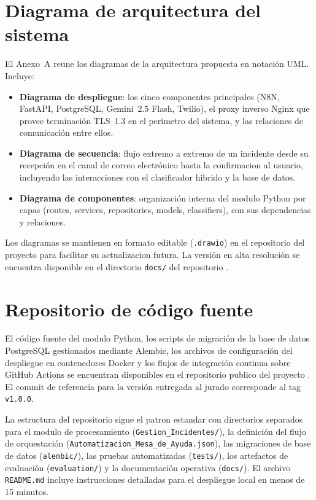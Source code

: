 
\section{Diagrama de arquitectura del sistema}

El Anexo~A reune los diagramas de la arquitectura propuesta en notación UML. Incluye:

\begin{itemize}
  \item \textbf{Diagrama de despliegue}: los cinco componentes principales (N8N, FastAPI, PostgreSQL, Gemini~2.5 Flash, Twilio), el proxy inverso Nginx que provee terminación TLS~1.3 en el perímetro del sistema, y las relaciones de comunicación entre ellos.
  \item \textbf{Diagrama de secuencia}: flujo extremo a extremo de un incidente desde su recepción en el canal de correo electrónico hasta la confirmacion al usuario, incluyendo las interacciones con el clasificador hibrido y la base de datos.
  \item \textbf{Diagrama de componentes}: organización interna del modulo Python por capas (routes, services, repositories, models, classifiers), con sus dependencias y relaciones.
\end{itemize}

Los diagramas se mantienen en formato editable (\texttt{.drawio}) en el repositorio del proyecto para facilitar su actualizacion futura. La versión en alta resolución se encuentra disponible en el directorio \texttt{docs/} del repositorio \parencite{Gomez2026_repositorio}.

\section{Repositorio de código fuente}

El código fuente del modulo Python, los scripts de migración de la base de datos PostgreSQL gestionados mediante Alembic, los archivos de configuración del despliegue en contenedores Docker y los flujos de integración continua sobre GitHub Actions se encuentran disponibles en el repositorio publico del proyecto \parencite{Gomez2026_repositorio}. El commit de referencia para la versión entregada al jurado corresponde al tag \texttt{v1.0.0}.

La estructura del repositorio sigue el patron estandar con directorios separados para el modulo de procesamiento (\texttt{Gestion\_Incidentes/}), la definición del flujo de orquestación (\texttt{Automatizacion\_Mesa\_de\_Ayuda.json}), las migraciones de base de datos (\texttt{alembic/}), las pruebas automatizadas (\texttt{tests/}), los artefactos de evaluación (\texttt{evaluation/}) y la documentación operativa (\texttt{docs/}). El archivo \texttt{README.md} incluye instrucciones detalladas para el despliegue local en menos de 15 minutos.

